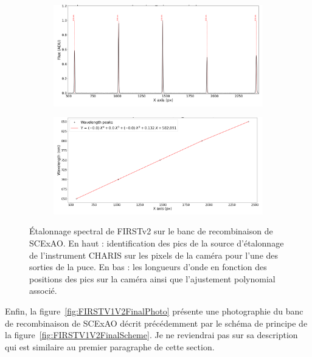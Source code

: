 \begin{figure}[ht!]
    \centering
    \begin{subfigure}{\textwidth}
        \centering
        \includegraphics[width=\textwidth]{Figure_Chap5/20220404_5TC_PY_SpectralCalFlux01_Crop.png}
    \end{subfigure}
    \begin{subfigure}{\textwidth}
        \centering
        \includegraphics[width=\textwidth]{Figure_Chap5/20220404_5TC_PY_SpectralCalFitFort01_Crop.png}
    \end{subfigure}
    \caption[Étalonnage spectral de FIRSTv2 sur le banc de recombinaison de SCExAO.]{Étalonnage spectral de FIRSTv2 sur le banc de recombinaison de SCExAO. En haut : identification des pics de la source d'étalonnage de l'instrument CHARIS sur les pixels de la caméra pour l'une des sorties de la puce. En bas : les longueurs d’onde en fonction des positions des pics sur la caméra ainsi que l’ajustement polynomial associé.}
    \label{fig:V2SpecCalSubaru}
\end{figure}

Enfin, la figure~\ref{fig:FIRSTV1V2FinalPhoto} présente une photographie du banc de recombinaison de \ac{SCExAO} décrit précédemment par le schéma de principe de la figure~\ref{fig:FIRSTV1V2FinalScheme}. Je ne reviendrai pas sur sa description qui est similaire au premier paragraphe de cette section.

